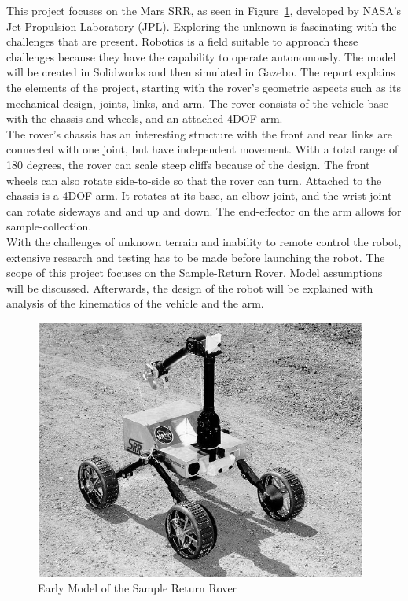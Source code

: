 This project focuses on the Mars \ac{SRR}, as seen in Figure~\ref{sample_return_rover:introduction:srr}, developed by NASA's Jet Propulsion Laboratory (JPL). Exploring the unknown is fascinating with the challenges that are present. Robotics is a field suitable to approach these challenges because they have the capability to operate autonomously. The model will be created in Solidworks and then simulated in Gazebo. The report explains the elements of the project, starting with the rover's geometric aspects such as its mechanical design, joints, links, and arm. The rover consists of the vehicle base with the chassis and wheels, and an attached \ac{4DOF} arm.\\

The rover's chassis has an interesting structure with the front and rear links are connected with one joint, but have independent movement. With a total range of 180 degrees, the rover can scale steep cliffs because of the design. The front wheels can also rotate side-to-side so that the rover can turn. Attached to the chassis is a \ac{4DOF} arm. It rotates at its base, an elbow joint, and the wrist joint can rotate sideways and and up and down. The end-effector on the arm allows for sample-collection. \\

With the challenges of unknown terrain and inability to remote control the robot, extensive research and testing has to be made before launching the robot. The scope of this project focuses on the Sample-Return Rover. Model assumptions will be discussed. Afterwards, the design of the robot will be explained with analysis of the kinematics of the vehicle and the arm.

\begin{figure}[htb]
	\centering
	\includegraphics[scale=0.70]{sections/introduction/images/srr.png}
	\caption{Early Model of the Sample Return Rover}
	\label{sample_return_rover:introduction:srr}
\end{figure}

